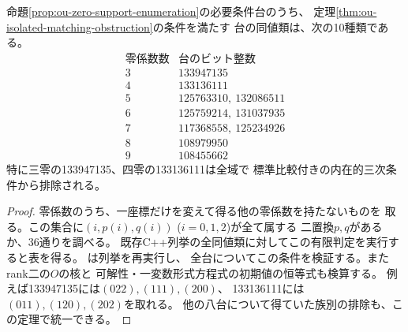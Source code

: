 \begin{corollary}[完全matchingを持つ必要条件台]
\label{cor:ou-isolated-matching-supports}
命題\ref{prop:ou-zero-support-enumeration}の必要条件台のうち、
定理\ref{thm:ou-isolated-matching-obstruction}の条件を満たす
台の同値類は、次の10種類である。
\[
\begin{array}{c|l}
\text{零係数数}&\text{台のビット整数}\\\hline
3&133947135\\
4&133136111\\
5&125763310,\ 132086511\\
6&125759214,\ 131037935\\
7&117368558,\ 125234926\\
8&108979950\\
9&108455662
\end{array}
\]
特に三零の133947135、四零の133136111は全域で
標準比較付きの内在的三次条件から排除される。
\end{corollary}
\begin{proof}
零係数のうち、一座標だけを変えて得る他の零係数を持たないものを
取る。この集合に$(i,p(i),q(i))$ ($i=0,1,2$)が全て属する
二置換$p,q$があるか、36通りを調べる。
既存C++列挙の全同値類に対してこの有限判定を実行すると表を得る。
は列挙を再実行し、
全台についてこの条件を検証する。またrank二の$O$の核と
可解性・一変数形式方程式の初期値の恒等式も検算する。
例えば133947135には$(022),(111),(200)$、
133136111には$(011),(120),(202)$を取れる。
他の八台について得ていた族別の排除も、この定理で統一できる。
\end{proof}


